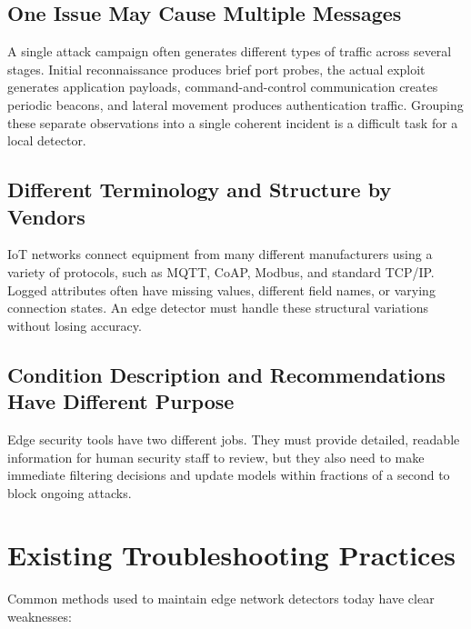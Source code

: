 \subsection{One Issue May Cause Multiple Messages}
\label{subsec:one_issue_multiple_messages}
A single attack campaign often generates different types of traffic across several stages. Initial reconnaissance produces brief port probes, the actual exploit generates application payloads, command-and-control communication creates periodic beacons, and lateral movement produces authentication traffic. Grouping these separate observations into a single coherent incident is a difficult task for a local detector.

\subsection{Different Terminology and Structure by Vendors}
\label{subsec:different_terminology_structure}
IoT networks connect equipment from many different manufacturers using a variety of protocols, such as MQTT, CoAP, Modbus, and standard TCP/IP. Logged attributes often have missing values, different field names, or varying connection states. An edge detector must handle these structural variations without losing accuracy.

\subsection{Condition Description and Recommendations Have Different Purpose}
\label{subsec:condition_description_recommendations}
Edge security tools have two different jobs. They must provide detailed, readable information for human security staff to review, but they also need to make immediate filtering decisions and update models within fractions of a second to block ongoing attacks.

\section{Existing Troubleshooting Practices}
\label{sec:existing_troubleshooting_practices}

Common methods used to maintain edge network detectors today have clear weaknesses:

